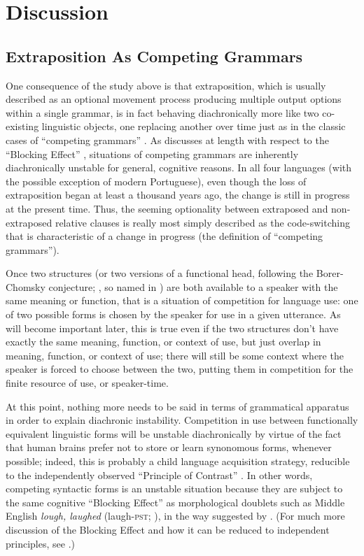 \section{Discussion}
\subsection{Extraposition As Competing Grammars}
\label{compete}

One consequence of the study above is that extraposition, which is usually described as an optional movement process producing multiple output options within a single grammar, is in fact behaving diachronically more like two co-existing linguistic objects, one replacing another over time just as in the classic cases of ``competing grammars'' \citep[][etc.]{kroch1989, kroch1994, santorini1992}. As \citet{kroch1994} discusses at length with respect to the ``Blocking Effect'' \citep[an expanded understanding of the principle first proposed in ]{aronoff1976}, situations of competing grammars are inherently diachronically unstable for general, cognitive reasons. In all four languages (with the possible exception of modern Portuguese), even though the loss of extraposition began at least a thousand years ago, the change is still in progress at the present time. Thus, the seeming optionality between extraposed and non-extraposed relative clauses is really most simply described as the code-switching that is characteristic of a change in progress (the definition of ``competing grammars'').

Once two structures (or two versions of a functional head, following the Borer-Chomsky conjecture; \citealt{borer1984, kroch1994}, so named in \citealt{baker2008}) are both available to a speaker with the same meaning or function, that is a situation of competition for language use: one of two possible forms is chosen by the speaker for use in a given utterance. As will become important later, this is true even if the two structures don't have exactly the same meaning, function, or context of use, but just overlap in meaning, function, or context of use; there will still be some context where the speaker is forced to choose between the two, putting them in competition for the finite resource of use, or speaker-time.

At this point, nothing more needs to be said in terms of grammatical apparatus in order to explain diachronic instability. Competition in use between functionally equivalent linguistic forms will be unstable diachronically by virtue of the fact that human brains prefer not to store or learn synonomous forms, whenever possible; indeed, this is probably a child language acquisition strategy, reducible to the independently observed ``Principle of Contrast'' \citep[][inter alia]{clark1987, clark1990}. In other words, competing syntactic forms is an unstable situation because they are subject to the same cognitive ``Blocking Effect'' as morphological doublets such as Middle English \textsl{lough, laughed} (laugh-\textsc{pst}; \citealt{taylor1994}), in the way suggested by \citet{kroch1994}.  (For much more discussion of the Blocking Effect and how it can be reduced to independent principles, see \citealt{fruehwaldwallenberginprep}.)

